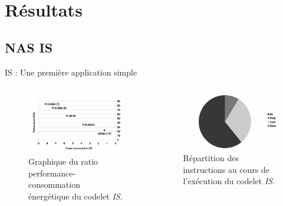 \documentclass{beamer}
\begin{document}
\section{Résultats}

\subsection{NAS IS}
\begin{frame}{IS : Une première application simple}

\begin{columns}

\begin{column}{0.4\paperwidth}
\begin{figure}
\centering
\includegraphics[width=\textwidth]{IS.eps}
\caption{\label{IS}Graphique du ratio performance-consommation énergétique du codelet \textit{IS}.}
\end{figure}
\end{column}

\begin{column}{0.4\paperwidth}
\begin{figure}
\centering
\includegraphics[width=\textwidth]{IS_instr.eps}
\caption{\label{IS_instr}Répartition des instructions au cours de l'exécution du codelet \textit{IS}.}
\end{figure}
\end{column}

\end{columns}

\end{frame}
\end{document}
